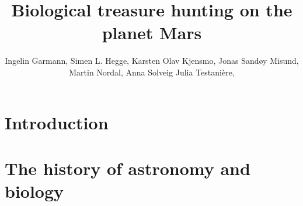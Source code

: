 \documentclass[DIV=calc, paper=a4, fontsize=12pt]{scrartcl}	 %
\title{Biological treasure hunting on the planet Mars} %
\author{Ingelin Garmann, Simen L. Hegge, Karsten Olav Kjensmo, Jonas Sandøy Misund, Martin Nordal, Anna Solveig Julia Testani\`{e}re, } %
\date{} %
\newcommand{\initial}[1]{ %
\lettrine[lines=3,lhang=0.3,nindent=0em]{
\color{DarkGoldenrod}
{\textsf{#1}}}{}}
\begin{document}
\maketitle %

\thispagestyle{fancy} %





\section*{Introduction}

\begin{multicols}{2}



\end{multicols}


\pagebreak

\section*{The history of astronomy and biology}
\end{document}
